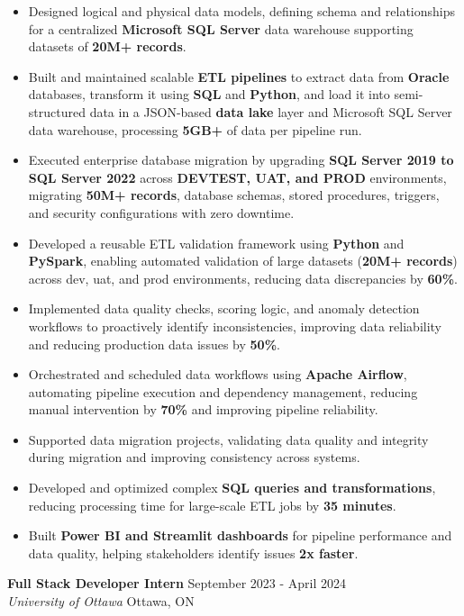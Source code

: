 \documentclass[a4paper]{article}
\begin{document}
\begin{itemize} \itemsep -2pt
\item Designed logical and physical data models, defining schema and relationships for a centralized \textbf{Microsoft SQL Server} data warehouse supporting datasets of \textbf{20M+ records}.
\item Built and maintained scalable \textbf{ETL pipelines} to extract data from \textbf{Oracle} databases, transform it using \textbf{SQL} and \textbf{Python}, and load it into semi-structured data in a JSON-based \textbf{data lake} layer and Microsoft SQL Server data warehouse, processing \textbf{5GB+} of data per pipeline run.
\item Executed enterprise database migration by upgrading \textbf{SQL Server 2019 to SQL Server 2022} across \textbf{DEVTEST, UAT, and PROD} environments, migrating \textbf{50M+ records}, database schemas, stored procedures, triggers, and security configurations with zero downtime.
\item Developed a reusable ETL validation framework using \textbf{Python} and \textbf{PySpark}, enabling automated validation of large datasets (\textbf{20M+ records}) across dev, uat, and prod environments, reducing data discrepancies by \textbf{60\%}.
\item Implemented data quality checks, scoring logic, and anomaly detection workflows to proactively identify inconsistencies, improving data reliability and reducing production data issues by \textbf{50\%}.
\item Orchestrated and scheduled data workflows using \textbf{Apache Airflow}, automating pipeline execution and dependency management, reducing manual intervention by \textbf{70\%} and improving pipeline reliability.
\item Supported data migration projects, validating data quality and integrity during migration and improving consistency across systems.
\item Developed and optimized complex \textbf{SQL queries and transformations}, reducing processing time for large-scale ETL jobs by \textbf{35 minutes}.
\item Built \textbf{Power BI and Streamlit dashboards} for pipeline performance and data quality, helping stakeholders identify issues \textbf{2x faster}.
\end{itemize}
\textbf{Full Stack Developer Intern } \hfill September 2023 - April 2024\\
\textit{University of Ottawa} \hfill Ottawa, ON\\
\end{document}

